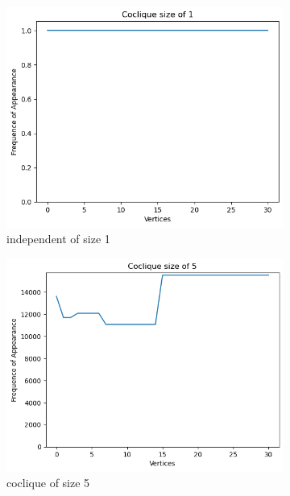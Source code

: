 \documentclass{amsart}
\theoremstyle{definition}
\begin{document}
\begin{appendix}
	\begin{figure}[hbt!]
		\caption*{Depth 5}
		\begin{subfigure}[b]{.45\textwidth}
			\centering
			\includegraphics[width=1\linewidth]{images/depth_5_size_1.png}
			\caption{independent of size 1}
		\end{subfigure}
		\begin{subfigure}[b]{.45\textwidth}
			\centering
			\includegraphics[width=1\linewidth]{images/depth_5_size_5.png}
			\caption{coclique of size 5}
		\end{subfigure}
		\begin{subfigure}[b]{.45\textwidth}
			\centering

\end{subfigure}
\end{figure}
\end{appendix}
\end{document}
